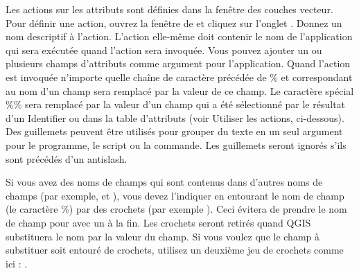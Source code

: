 Les actions sur les attributs sont définies dans la fenêtre  des couches vecteur. Pour définir une action, ouvrez la fenêtre de  et cliquez sur l'onglet . Donnez un nom descriptif à l'action. L'action elle-même doit contenir le nom de l'application qui sera exécutée quand l'action sera invoquée. Vous pouvez ajouter un ou plusieurs champs d'attributs comme argument pour l'application. Quand l'action est invoquée n'importe quelle chaîne de caractère précédée de \% et correspondant au nom d'un champ sera remplacé par la valeur de ce champ. Le caractère spécial \%\% \index{\%\%} sera remplacé par la valeur d'un champ qui a été sélectionné par le résultat d'un Identifier ou dans la table d'attributs (voir Utiliser les actions, ci-dessous). Des guillemets peuvent être utilisés pour grouper du texte en un seul argument pour le programme, le script ou la commande. Les guillemets seront ignorés s'ils sont précédés d'un antislash.

Si vous avez des noms de champs qui sont contenus dans d'autres noms de champs (par exemple,  et ), vous devez l'indiquer en entourant le nom de champ (le caractère \%) par des crochets (par exemple \usertext{[\%col10]}). Ceci évitera de prendre le nom de champ  pour  avec un  à la fin. Les crochets seront retirés quand QGIS substituera le nom par la valeur du champ. Si vous voulez que le champ à substituer soit entouré de crochets, utilisez un deuxième jeu de crochets comme ici : \usertext{[[\%col10]]}.

